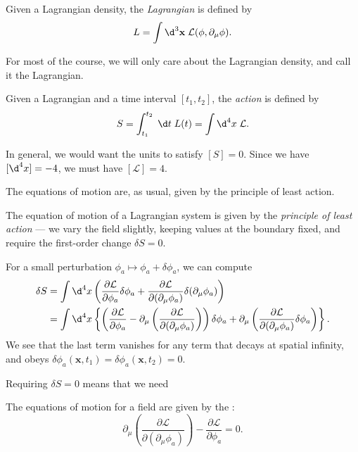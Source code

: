\documentclass[a4paper]{article}
\begin{document}
\begin{defi}[Lagrangian]
  Given a Lagrangian density, the \emph{Lagrangian} is defined by
  \[
    L = \int \d^3 \mathbf{x}\; \mathcal{L}(\phi, \partial_\mu \phi).
  \]
\end{defi}
For most of the course, we will only care about the Lagrangian density, and call it the Lagrangian.

\begin{defi}[Action]
  Given a Lagrangian and a time interval $[t_1, t_2]$, the \emph{action} is defined by
  \[
    S = \int_{t_1}^{t_2} \;\d t\; L(t) = \int \d^4 x\; \mathcal{L}.
  \]
\end{defi}
In general, we would want the units to satisfy $[S] = 0$. Since we have $[\d^4 x] = -4$, we must have $[\mathcal{L}] = 4$.

The equations of motion are, as usual, given by the principle of least action.
\begin{defi}
  The equation of motion of a Lagrangian system is given by the \emph{principle of least action} --- we vary the field slightly, keeping values at the boundary fixed, and require the first-order change $\delta S = 0$.
\end{defi}

For a small perturbation $\phi_a \mapsto \phi_a + \delta \phi_a$, we can compute
\begin{align*}
  \delta S &= \int \d^4 x\left(\frac{\partial \mathcal{L}}{\partial \phi_a} \delta \phi_a + \frac{\partial \mathcal{L}}{\partial (\partial_\mu \phi_a)} \delta(\partial_\mu\phi_a)\right)\\
  &= \int \d^4 x \left\{\left(\frac{\partial \mathcal{L}}{\partial \phi_a} - \partial_\mu\left(\frac{\partial \mathcal{L}}{\partial (\partial_\mu\phi_a)}\right)\right) \delta \phi_a + \partial_\mu \left(\frac{\partial \mathcal{L}}{\partial (\partial_\mu\phi_a)} \delta\phi_a\right)\right\}.
\end{align*}
We see that the last term vanishes for any term that decays at spatial infinity, and obeys $\delta \phi_a(\mathbf{x}, t_1) = \delta\phi_a(\mathbf{x}, t_2) = 0$.

Requiring $\delta S = 0$ means that we need
\begin{prop}
  The equations of motion for a field are given by the :
  \[
    \partial_\mu\left(\frac{\partial \mathcal{L}}{\partial (\partial_\mu \phi_a)}\right) - \frac{\partial \mathcal{L}}{\partial \phi_a} = 0.
  \]
\end{prop}
\end{document}
